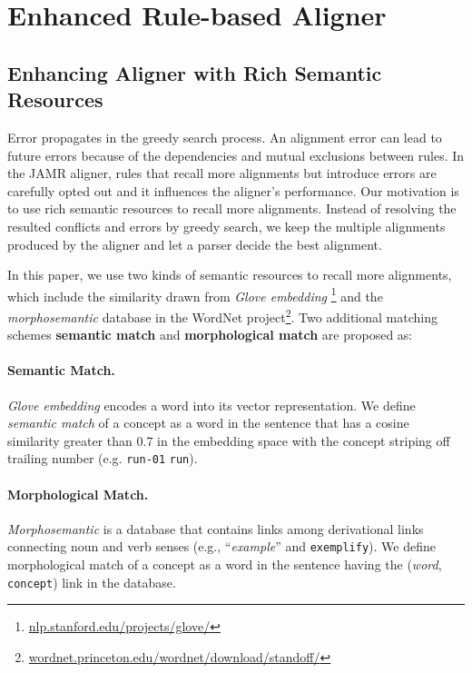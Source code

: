 \documentclass[11pt,a4paper]{article}
\begin{document}
\section{Enhanced Rule-based Aligner}\label{sec:aligner}



\subsection{Enhancing Aligner with Rich Semantic Resources}

Error propagates in the greedy search process.
An alignment error can lead to future errors because of the
dependencies and mutual exclusions between rules.
In the JAMR aligner, rules that recall more
alignments but introduce errors are carefully
opted out and it influences the aligner's performance.
Our motivation is to use rich semantic resources
to recall more alignments.
Instead of resolving the resulted conflicts and errors by greedy search,
we keep the multiple alignments produced by the aligner
and let a parser decide the best alignment.

In this paper, we use two kinds of semantic resources to recall more
alignments, which include the similarity drawn
from \textit{Glove embedding} \cite{pennington-socher-manning:2014:EMNLP2014}\footnote{\url{nlp.stanford.edu/projects/glove/}} and
the {\it morphosemantic} database \cite{10.1007/978-3-642-04235-5_30} in the WordNet project\footnote{\url{wordnet.princeton.edu/wordnet/download/standoff/}}.
Two additional matching schemes {\bf semantic match} and {\bf morphological match} are proposed as:

\paragraph{Semantic Match.} \textit{Glove embedding}
encodes a word into its vector representation.
We define \textit{semantic match} of a concept
as a word in the sentence
that has a cosine similarity greater than 0.7 in the embedding space
with the concept striping off
trailing number (e.g. {\tt run-01}  {\tt run}).

\paragraph{Morphological Match.} \textit{Morphosemantic} is a 
database that contains links among derivational links connecting
noun and verb senses (e.g., ``{\it example}'' and {\tt exemplify}).
We define morphological match of a concept as a word in the sentence 
having the ({\it word}, \texttt{concept}) link in the database.
\end{document}
